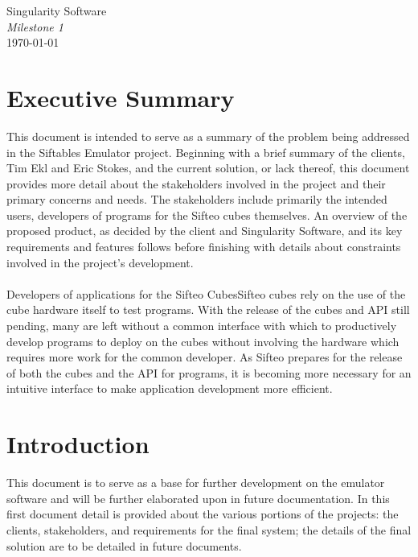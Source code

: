 \documentclass[12pt]{article}
\begin{document}
\vspace*{\fill}
        \begin{center}
                \LARGE{Singularity Software} \\
                \LARGE{\textit{Milestone 1}} \\
                \vspace{.15in}
                \large{\today} \\
        \end{center}
\vspace*{\fill}

\clearpage

\tableofcontents

\clearpage
        
\section{Executive Summary}
This document is intended to serve as a summary of the problem being addressed in the Siftables Emulator project.  Beginning with a brief summary of the clients, Tim Ekl and Eric Stokes, and the current solution, or lack thereof, this document provides more detail about the stakeholders involved in the project and their primary concerns and needs.  The stakeholders include primarily the intended users, developers of programs for the Sifteo cubes themselves.  An overview of the proposed product, as decided by the client and Singularity Software, and its key requirements and features follows before finishing with details about constraints involved in the project's development. \\\\
Developers of applications for the Sifteo Cubes\gls{Sifteo cubes} rely on the use of the cube hardware itself to test programs.  With the release of the cubes and API still pending, many are left without a common interface with which to productively develop programs to deploy on the cubes without involving the hardware which requires more work for the common developer.  As Sifteo prepares for the release of both the cubes and the API for programs, it is becoming more necessary for an intuitive interface to make application development more efficient.

\section{Introduction}
This document is to serve as a base for further development on the emulator software and will be further elaborated upon in future documentation.  In this first document detail is provided about the various portions of the projects: the clients, stakeholders, and requirements for the final system; the details of the final solution are to be detailed in future documents.
\end{document}
